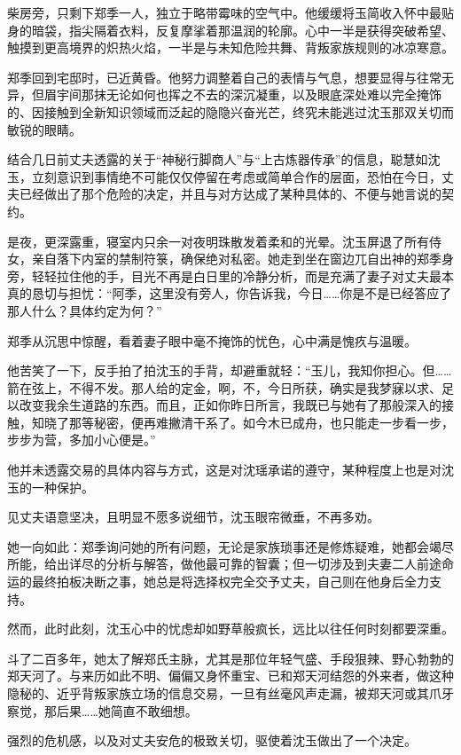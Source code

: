 柴房旁，只剩下郑季一人，独立于略带霉味的空气中。他缓缓将玉简收入怀中最贴身的暗袋，指尖隔着衣料，反复摩挲着那温润的轮廓。心中一半是获得突破希望、触摸到更高境界的炽热火焰，一半是与未知危险共舞、背叛家族规则的冰凉寒意。

郑季回到宅邸时，已近黄昏。他努力调整着自己的表情与气息，想要显得与往常无异，但眉宇间那抹无论如何也挥之不去的深沉凝重，以及眼底深处难以完全掩饰的、因接触到全新知识领域而泛起的隐隐兴奋光芒，终究未能逃过沈玉那双关切而敏锐的眼睛。

结合几日前丈夫透露的关于“神秘行脚商人”与“上古炼器传承”的信息，聪慧如沈玉，立刻意识到事情绝不可能仅仅停留在考虑或简单合作的层面，恐怕在今日，丈夫已经做出了那个危险的决定，并且与对方达成了某种具体的、不便与她言说的契约。

是夜，更深露重，寝室内只余一对夜明珠散发着柔和的光晕。沈玉屏退了所有侍女，亲自落下内室的禁制符箓，确保绝对私密。她走到坐在窗边兀自出神的郑季身旁，轻轻拉住他的手，目光不再是白日里的冷静分析，而是充满了妻子对丈夫最本真的恳切与担忧：“阿季，这里没有旁人，你告诉我，今日……你是不是已经答应了那人什么？具体约定为何？”

郑季从沉思中惊醒，看着妻子眼中毫不掩饰的忧色，心中满是愧疚与温暖。

他苦笑了一下，反手拍了拍沈玉的手背，却避重就轻：“玉儿，我知你担心。但……箭在弦上，不得不发。那人给的定金，啊，不，今日所获，确实是我梦寐以求、足以改变我余生道路的东西。而且，正如你昨日所言，我既已与她有了那般深入的接触，知晓了那等秘密，便再难撇清干系了。如今木已成舟，也只能走一步看一步，步步为营，多加小心便是。”

他并未透露交易的具体内容与方式，这是对沈瑶承诺的遵守，某种程度上也是对沈玉的一种保护。

见丈夫语意坚决，且明显不愿多说细节，沈玉眼帘微垂，不再多劝。

她一向如此：郑季询问她的所有问题，无论是家族琐事还是修炼疑难，她都会竭尽所能，给出详尽的分析与解答，做他最可靠的智囊；但一切涉及到夫妻二人前途命运的最终拍板决断之事，她总是将选择权完全交予丈夫，自己则在他身后全力支持。

然而，此时此刻，沈玉心中的忧虑却如野草般疯长，远比以往任何时刻都要深重。

斗了二百多年，她太了解郑氏主脉，尤其是那位年轻气盛、手段狠辣、野心勃勃的郑天河了。与来历如此不明、偏偏又身怀重宝、已和郑天河结怨的外来者，做这种隐秘的、近乎背叛家族立场的信息交易，一旦有丝毫风声走漏，被郑天河或其爪牙察觉，那后果……她简直不敢细想。

强烈的危机感，以及对丈夫安危的极致关切，驱使着沈玉做出了一个决定。

